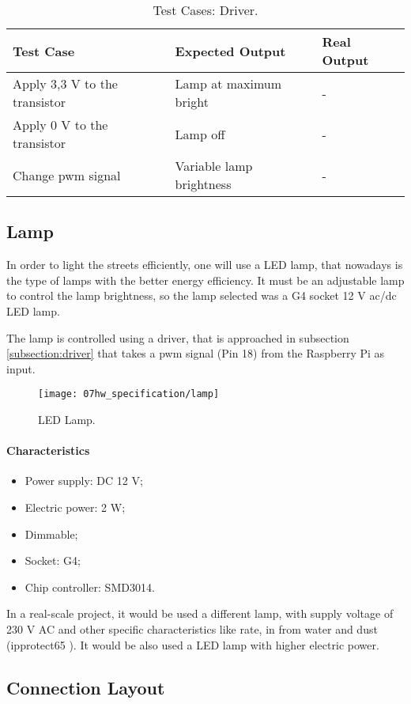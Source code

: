 \begin{table}[H]
	\centering
	\resizebox{\columnwidth}{!}
	{
		\begin{tabular}{|m{3cm}|m{5cm}||m{5cm}|}
			\hline
			\textbf{Test Case} & \textbf{Expected Output} & \textbf{Real Output}
			\\\hline\hline
			Apply 3,3 V to the transistor & Lamp at maximum bright & -
			\\\hline
			Apply 0 V to the transistor & Lamp off & -
			\\\hline
			Change \ac{pwm} signal & Variable lamp brightness & -
			\\\hline
		\end{tabular}
	}
	\caption{Test Cases: Driver.}
	\label{table:test_driver}
\end{table}

\clearpage
\subsection{Lamp}

In order to light the streets efficiently, one will use a LED lamp, that nowadays is the type of lamps with the better energy efficiency. It must be an adjustable lamp to control the lamp brightness, so the lamp selected was a G4 socket 12 V \ac{ac}/\ac{dc} LED lamp.

The lamp is controlled using a driver, that is approached in subsection \ref{subsection:driver} that takes a \ac{pwm} signal (Pin 18) from the Raspberry Pi as input. 

\begin{figure}[H]
	\centering
	\texttt{[image: 07hw\_specification/lamp]}
	\caption{LED Lamp.}
	\label{fig:lamp}
\end{figure}

\paragraph*{Characteristics}
\begin{itemize}
	\item Power supply: DC 12 V;
	\item Electric power: 2 W;
	\item Dimmable;
	\item Socket: G4;   
	\item Chip controller: SMD3014.
\end{itemize}

In a real-scale project, it would be used a different lamp, with supply voltage of 230 V AC and other specific characteristics  like  rate, in from water and dust (\ac{ipprotect}65 \cite{ip65}). It would be also used a LED lamp with higher electric power. 

\subsection{Connection Layout} %
